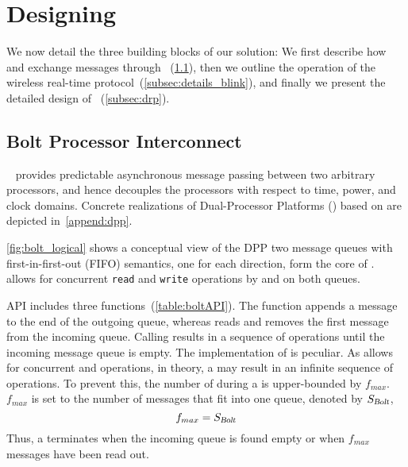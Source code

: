 \section{Designing \DRP}
\label{sec:designDetailed}

We now detail the three building blocks of our solution:
We first describe how \APs and \CPs exchange messages through \bolt~(\cref{subsec:boltAPI}), then we outline the operation of the \blink wireless real-time protocol~(\cref{subsec:details_blink}), and finally we present the detailed design of \DRP~(\cref{subsec:drp}).

\subsection{Bolt Processor Interconnect}
\label{subsec:boltAPI}

\bolt~\cite{sutton2015Bolt} provides predictable asynchronous message passing between two arbitrary processors, and hence decouples the processors with respect to time, power, and clock domains.
Concrete realizations of Dual-Processor Platforms (\DPP) based on \bolt are depicted in~\cref{append:dpp}.

\cref{fig:bolt_logical} shows a conceptual view of the DPP two message queues with first-in-first-out (FIFO) semantics, one for each direction, form the core of \bolt.
\bolt allows for concurrent \texttt{read} and \texttt{write} operations by \ap and \cp on both queues.

\bolt API includes three functions~(\cref{table:boltAPI}).
The \opwrite function appends a message to the end of the outgoing queue, whereas \opread reads and removes the first message from the incoming queue.
Calling \opflush results in a sequence of \opread operations until the incoming message queue is empty.
The implementation of \opflush is peculiar.
As \bolt allows for concurrent \opread and \opwrite operations, in theory, a \opflush may result in an infinite sequence of {\opread} operations.
To prevent this, the number of {\opread} during a \opflush is upper-bounded by $f_{max}$.
$f_{max}$ is set to the number of messages that fit into one \bolt queue, denoted by $S_{\textsl{Bolt}}$,
\begin{equation}
\label{eq:f_max=M}
f_{max} = S_{\textsl{Bolt}}
\end{equation}
Thus, a \opflush terminates when the incoming queue is found empty or when $f_{max}$ messages have been read out.


